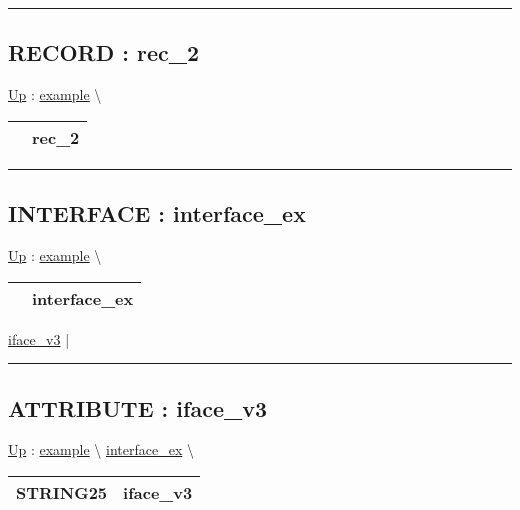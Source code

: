 \par


\rule{\linewidth}{0.5pt}
\subsection*{RECORD : rec\_2}
\hypertarget{ecldoc:example.rec_2}{}
\hyperlink{ecldoc:example}{Up} :
\hspace{0pt} \hyperlink{ecldoc:example}{example} \textbackslash 

{\renewcommand{\arraystretch}{1.5}
\begin{tabularx}{\textwidth}{|>{\raggedright\arraybackslash}l|X|}
\hline
\hspace{0pt} & rec\_2 \\
\hline
\end{tabularx}
}

\par


\rule{\linewidth}{0.5pt}
\subsection*{INTERFACE : interface\_ex}
\hypertarget{ecldoc:example.interface_ex}{}
\hyperlink{ecldoc:example}{Up} :
\hspace{0pt} \hyperlink{ecldoc:example}{example} \textbackslash 

{\renewcommand{\arraystretch}{1.5}
\begin{tabularx}{\textwidth}{|>{\raggedright\arraybackslash}l|X|}
\hline
\hspace{0pt} & interface\_ex \\
\hline
\end{tabularx}
}

\par


\hyperlink{ecldoc:example.interface_ex.iface_v3}{iface\_v3}  |

\rule{\linewidth}{0.5pt}

\subsection*{ATTRIBUTE : iface\_v3}
\hypertarget{ecldoc:example.interface_ex.iface_v3}{}
\hyperlink{ecldoc:example.interface_ex}{Up} :
\hspace{0pt} \hyperlink{ecldoc:example}{example} \textbackslash 
\hspace{0pt} \hyperlink{ecldoc:example.interface_ex}{interface_ex} \textbackslash 

{\renewcommand{\arraystretch}{1.5}
\begin{tabularx}{\textwidth}{|>{\raggedright\arraybackslash}l|X|}
\hline
\hspace{0pt}STRING25 & iface\_v3 \\
\hline
\end{tabularx}
}

